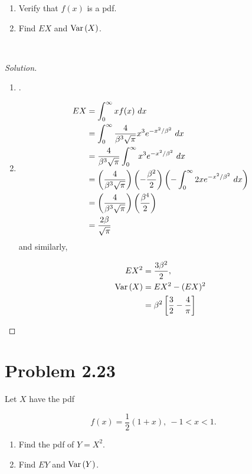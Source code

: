 \documentclass[12pt,letterpaper,reqno]{amsart}
\numberwithin{equation}{subsection}
\begin{document}
\begin{enumerate}[label=(\alph*),leftmargin=*]
    \item Verify that $f(x)$ is a pdf.
    \item Find $EX$ and $\Var{X}$.
\end{enumerate}~\\

\begin{proof}[Solution]~\\

\begin{enumerate}[label=(\alph*),leftmargin=*]
    \item  \cite[Theorem 1.6.5 on page 36]{Berger-Casella}.
    \item
    
    \begin{align*}
        EX 
        &= \myint{xf(x)}{x}{0}{\infty} \\
        &= \myint{\frac{4}{\beta^3 \sqrt{\pi}} x^3 e^{-x^2/ \beta^2}}{x}{0}{\infty} \\
        &= \frac{4}{\beta^3 \sqrt{\pi}} \myint{x^3 e^{-x^2/ \beta^2}}{x}{0}{\infty} \\
        &= \left( \frac{4}{\beta^3 \sqrt{\pi}} \right) \left(- \frac{\beta^2}{2} \right) \left( - \myint{2xe^{-x^2/\beta^2}}{x}{0}{\infty} \right) \\
        &= \left( \frac{4}{\beta^3 \sqrt{\pi}} \right) \left( \frac{\beta^4}{2} \right) \\
        &= \frac{2\beta}{\sqrt{\pi}}
    \end{align*}
    and similarly,
    
    \begin{align*}
        EX^2 &= \frac{3\beta^2}{2}, \\
        \Var{X} &= EX^2 - (EX)^2 \\
                &= \beta^2 \left[ \frac{3}{2} - \frac{4}{\pi} \right]
    \end{align*}
\end{enumerate}
\end{proof}

\newpage
\section{Problem 2.23}

Let $X$ have the pdf 

\[ f(x) = \frac{1}{2}(1+x), \ -1 < x < 1. \]
\begin{enumerate}[label=(\alph*),leftmargin=*]
    \item Find the pdf of $Y = X^2$.
    \item Find $EY$ and $\Var{Y}$.
\end{enumerate}~\\
\end{document}
